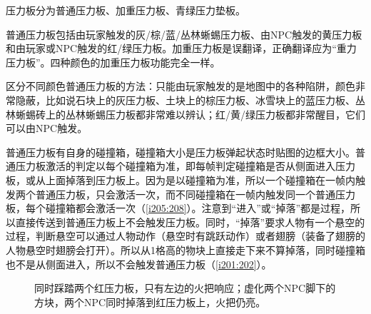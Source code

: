 压力板分为普通压力板、加重压力板、青绿压力垫板。

普通压力板包括由玩家触发的灰/棕/蓝/丛林蜥蜴压力板、由NPC触发的黄压力板和由玩家或NPC触发的红/绿压力板。加重压力板是误翻译，正确翻译应为“重力压力板”。四种颜色的加重压力板功能完全一样。

\begin{remark}
区分不同颜色普通压力板的方法：只能由玩家触发的是地图中的各种陷阱，颜色非常隐蔽，比如说石块上的灰压力板、土块上的棕压力板、冰雪块上的蓝压力板、丛林蜥蜴砖上的丛林蜥蜴压力板都非常难以辨认；红/黄/绿压力板都非常醒目，它们可以由NPC触发。
\end{remark}

普通压力板有自身的碰撞箱，碰撞箱大小是压力板弹起状态时贴图的边框大小。普通压力板激活的判定以每个碰撞箱为准，即每帧判定碰撞箱是否从侧面进入压力板，或从上面掉落到压力板上。因为是以碰撞箱为准，所以一个碰撞箱在一帧内触发两个普通压力板，只会激活一次，而不同碰撞箱在一帧内触发同一个普通压力板，每个碰撞箱都会激活一次（\autoref{i205:208}）。注意到“进入”或“掉落”都是过程，所以直接传送到普通压力板上不会触发压力板。同时，“掉落”要求人物有一个悬空的过程，判断悬空可以通过人物动作（悬空时有跳跃动作）或者翅膀（装备了翅膀的人物悬空时翅膀会打开）。所以从1格高的物块上直接走下来不算掉落，同时碰撞箱也不是从侧面进入，所以不会触发普通压力板（\autoref{i201:202}）。

\begin{figure}[!ht]
\begin{center}
\qquad
{}
\end{center}
\caption{\protect{}同时踩踏两个红压力板，只有左边的火把响应；\protect{}虚化两个NPC脚下的方块，两个NPC同时掉落到红压力板上，火把仍亮。}
\label{i205:208}
\end{figure}

